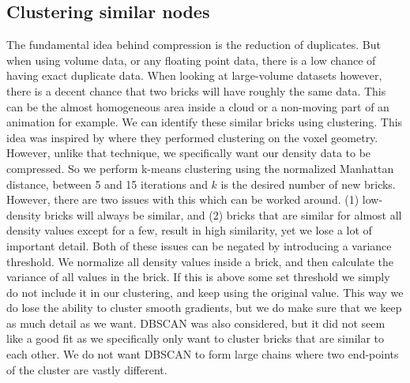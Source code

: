 \subsection{Clustering similar nodes} \label{approach:clustering_similar_nodes}
The fundamental idea behind compression is the reduction of duplicates. But when using volume data, or any floating point data, there is a low chance of having exact duplicate data. When looking at large-volume datasets however, there is a decent chance that two bricks will have roughly the same data. This can be the almost homogeneous area inside a cloud or a non-moving part of an animation for example. We can identify these similar bricks using clustering. This idea was inspired by \cite{van2020lossy} where they performed clustering on the voxel geometry. However, unlike that technique, we specifically want our density data to be compressed. So we perform k-means clustering \cite{macqueen1967some} using the normalized Manhattan distance, between 5 and 15 iterations and $k$ is the desired number of new bricks. However, there are two issues with this which can be worked around. (1) low-density bricks will always be similar, and (2) bricks that are similar for almost all density values except for a few, result in high similarity, yet we lose a lot of important detail. Both of these issues can be negated by introducing a variance threshold. We normalize all density values inside a brick, and then calculate the variance of all values in the brick. If this is above some set threshold we simply do not include it in our clustering, and keep using the original value. This way we do lose the ability to cluster smooth gradients, but we do make sure that we keep as much detail as we want. DBSCAN \cite{ester1996density} was also considered, but it did not seem like a good fit as we specifically only want to cluster bricks that are similar to each other. We do not want DBSCAN to form large chains where two end-points of the cluster are vastly different.